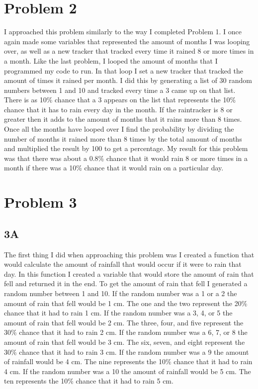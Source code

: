 \documentclass[12pt]{article}
\begin{document}
\section{Problem 2}
I approached this problem similarly to the way I completed Problem 1. I once again made some variables that represented the amount of months I was looping over, as well as a new tracker that tracked every time it rained 8 or more times in a month. Like the last problem, I looped the amount of months that I programmed my code to run. In that loop I set a new tracker that tracked the amount of times it rained per month. I did this by generating a list of 30 random numbers between 1 and 10 and tracked every time a 3 came up on that list. There is as 10\% chance that a 3 appears on the list that represents the 10\% chance that it has to rain every day in the month. If the raintracker is 8 or greater then it adds to the amount of months that it rains more than 8 times. Once all the months have looped over I find the probability by dividing the number of months it rained more than 8 times by the total amount of months and multiplied the result by 100 to get a percentage. My result for this problem was that there was about a 0.8\% chance that it would rain 8 or more times in a month if there was a 10\% chance that it would rain on a particular day.
\section{Problem 3}
\subsection{3A}
The first thing I did when approaching this problem was I created a function that would calculate the amount of rainfall that would occur if it were to rain that day. In this function I created a variable that would store the amount of rain that fell and returned it in the end. To get the amount of rain that fell I generated a random number between 1 and 10. If the random number was a 1 or a 2 the amount of rain that fell would be 1 cm. The one and the two represent the 20\% chance that it had to rain 1 cm. If the random number was a 3, 4, or 5 the amount of rain that fell would be 2 cm. The three, four, and five represent the 30\% chance that it had to rain 2 cm. If the random number was a 6, 7, or 8 the amount of rain that fell would be 3 cm. The six, seven, and eight represent the 30\% chance that it had to rain 3 cm. If the random number was a 9 the amount of rainfall would be 4 cm. The nine represents the 10\% chance that it had to rain 4 cm. If the random number was a 10 the amount of rainfall would be 5 cm. The ten represents the 10\% chance that it had to rain 5 cm.
\end{document}
